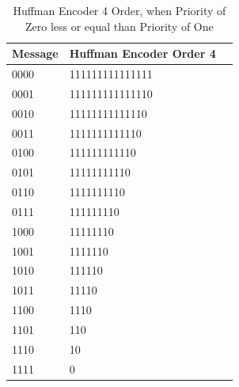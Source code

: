 \begin{refsection}
\begin{table}[H]
\centering
\caption{Huffman Encoder 4 Order, when Priority of Zero less or equal than Priority of One}
\label{tb:hufmmanencoder6}
\begin{tabular}{|l|l|l|}
\hline
\textbf{Message}                      & \textbf{Huffman Encoder Order 4}                                       \\ \hline
0000                 & 111111111111111                                                         \\ \hline
0001                 & 111111111111110                                              \\ \hline
0010                 & 11111111111110                                            \\ \hline
0011                 & 1111111111110                                       \\ \hline
0100                 & 111111111110                                                          \\ \hline
0101                 & 11111111110                                                          \\ \hline
0110                 & 1111111110                                                         \\ \hline
0111                 & 111111110                                                         \\ \hline
1000                 & 11111110                                                          \\ \hline
1001                 & 1111110                                                          \\ \hline
1010                 & 111110                                                         \\ \hline
1011                 & 11110                                                   \\ \hline
1100                 & 1110                                                          \\ \hline
1101                 & 110                                                          \\ \hline
1110                 & 10                                                         \\ \hline
1111                 & 0                                                         \\ \hline
\end{tabular}
\end{table}



\end{refsection}
